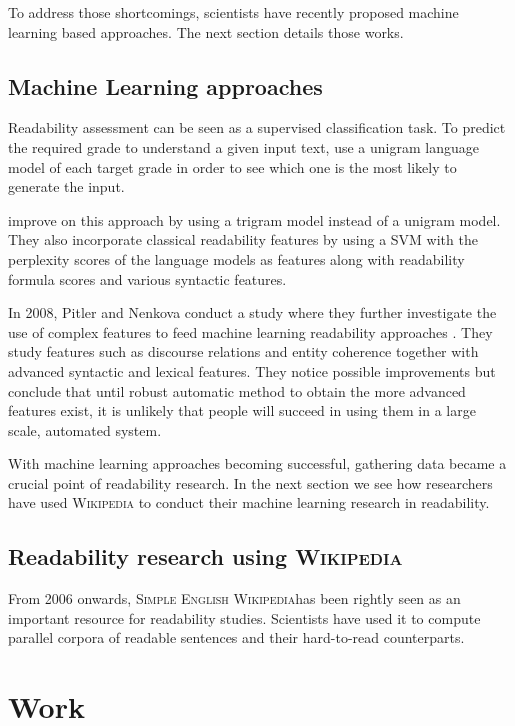 \documentclass[a4paper, 11pt, onepage]{scrreprt}
\newcommand\wiki{\textsc{Wikipedia}}
\newcommand\sew{\textsc{Simple English Wikipedia}}
\begin{document}
To address those shortcomings, scientists have recently proposed
machine learning based approaches. The next section details those
works.

\section{Machine Learning approaches}
\label{sec:ml-approaches}

Readability assessment can be seen as a supervised classification
task. To predict the required grade to understand a given input text,
\cite{collins2004language} use a unigram language model of each target
grade in order to see which one is the most likely to generate the
input.

\cite{schwarm2005reading} improve on this approach by using a trigram
model instead of a unigram model. They also incorporate classical
readability features by using a SVM with the perplexity scores of the
language models as features along with readability formula scores and
various syntactic features.

In 2008, Pitler and Nenkova conduct a study where they further
investigate the use of complex features to feed machine learning
readability approaches \cite{pitler2008revisiting}. They study
features such as discourse relations and entity coherence together
with advanced syntactic and lexical features. They notice possible
improvements but conclude that until robust automatic method to obtain
the more advanced features exist, it is unlikely that people will
succeed in using them in a large scale, automated system.

With machine learning approaches becoming successful, gathering data
became a crucial point of readability research. In the next section we
see how researchers have used \wiki{} to conduct their machine
learning research in readability.

\section{Readability research using \wiki}
\label{sec:wiki-approaches}

From 2006 onwards, \sew has been rightly seen as an important resource
for readability studies. Scientists have used it to compute parallel
corpora of readable sentences and their hard-to-read counterparts.

\chapter{Work}
\label{cha:work}
\end{document}

